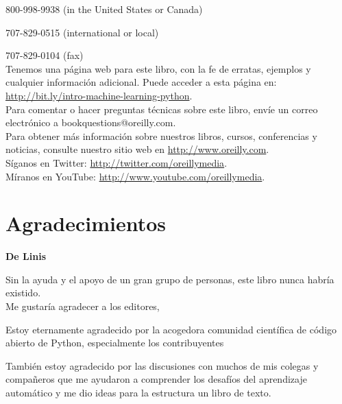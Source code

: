 800-998-9938 (in the United States or Canada)

707-829-0515 (international or local)

707-829-0104 (fax)\\




Tenemos una página web para este libro, con la fe de erratas, ejemplos y cualquier información adicional. Puede acceder a esta página en:\\ \href{http://bit.ly/intro-machine-learning-python}{\color{vino}http://bit.ly/intro-machine-learning-python}.\\

Para comentar o hacer preguntas técnicas sobre este libro, envíe un correo electrónico a {\color{vino} bookquestions@oreilly.com}.\\

Para obtener más información sobre nuestros libros, cursos, conferencias y noticias, consulte nuestro sitio web en \href{https://www.oreilly.com/}{\color{vino} http://www.oreilly.com}.\\

Síganos en Twitter:   \href{ http://twitter.com/oreillymedia}{\color{vino} http://twitter.com/oreillymedia}.\\
Míranos en YouTube:   \hspace{0.5cm} \href{http://www.youtube.com/oreillymedia}{\color{vino} http://www.youtube.com/oreillymedia}.\\


\section*{Agradecimientos}


{\bf{De Linis}}


Sin la ayuda y el apoyo de un gran grupo de personas, este libro nunca habría existido.\\

Me gustaría agradecer a los editores, 

Estoy eternamente agradecido por la acogedora comunidad científica de código abierto de Python, 
especialmente los contribuyentes 

También estoy agradecido por las discusiones con muchos de mis colegas y compañeros que me ayudaron
a comprender los desafíos del aprendizaje automático y me dio ideas para la estructura un libro de texto. \\


